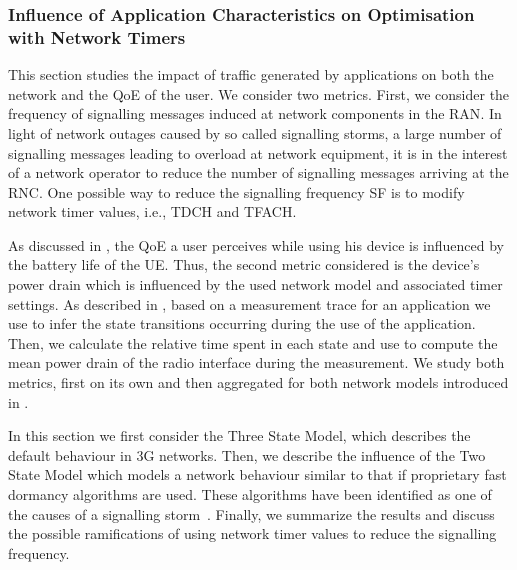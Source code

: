 \subsubsection*{Influence of Application Characteristics on Optimisation with Network Timers}\label{sec:network:network_traces:numerical_results:application_influence}
This section studies the impact of traffic generated by applications on both the network and the
\gls{QoE} of the user.
We consider two metrics.
First, we consider the frequency of signalling messages induced at network components in the \gls{RAN}.
In light of network outages caused by so called signalling storms, a large number of signalling messages leading to overload at network equipment, it is in the interest of a network operator to reduce the number of signalling messages arriving at the \gls{RNC}.
One possible way to reduce the signalling frequency \gls{SF} is to modify network timer values, i.e., \gls{TDCH} and \gls{TFACH}.

As discussed in , the \gls{QoE} a user perceives while using his device is influenced by the battery life of the \gls{UE}.
Thus, the second metric considered is the device’s power drain which is influenced by the used network model and associated timer settings.
As described in , based on a measurement trace for an application we use  to infer the state transitions occurring during the use of the application.
Then, we calculate the relative time spent in each state and use  to compute the mean power
drain of the radio interface during the measurement.
We study both metrics, first on its own and then aggregated for both network models introduced in .

In this section we first consider the Three State Model, which describes the default behaviour in \gls{3G} networks. 
Then, we describe the influence of the Two State Model which models a network behaviour similar to that if proprietary fast dormancy algorithms are used.
These algorithms have been identified as one of the causes of a signalling storm~\cite{NSN2011}.
Finally, we summarize the results and discuss the possible ramifications of using network timer values to reduce the signalling frequency.

